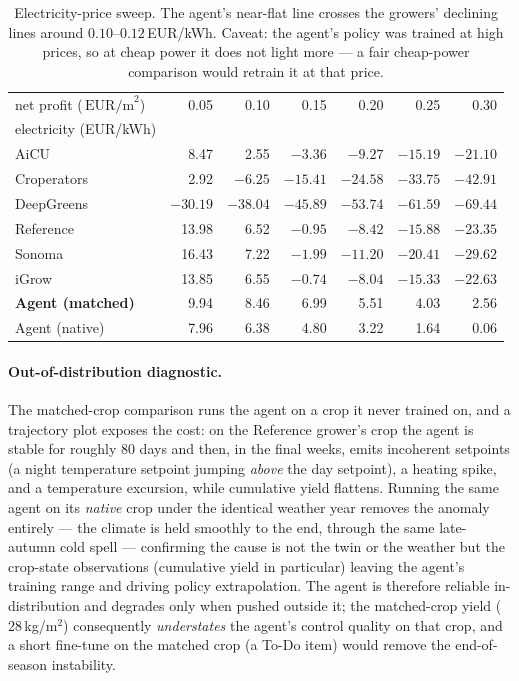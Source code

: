 \documentclass[11pt]{article}
\newcommand{\eurpm}{\,\text{EUR/m}^2}
\begin{document}
\begin{table}[h]
\centering
\small
\begin{tabular}{lrrrrrr}
\toprule
net profit ($\eurpm$) & 0.05 & 0.10 & 0.15 & 0.20 & 0.25 & 0.30 \\
electricity (EUR/kWh) & & & & & & \\
\midrule
AiCU        &  8.47 &  2.55 & $-3.36$ & $-9.27$ & $-15.19$ & $-21.10$ \\
Croperators &  2.92 & $-6.25$ & $-15.41$ & $-24.58$ & $-33.75$ & $-42.91$ \\
DeepGreens  & $-30.19$ & $-38.04$ & $-45.89$ & $-53.74$ & $-61.59$ & $-69.44$ \\
Reference   & 13.98 &  6.52 & $-0.95$ & $-8.42$ & $-15.88$ & $-23.35$ \\
Sonoma      & 16.43 &  7.22 & $-1.99$ & $-11.20$ & $-20.41$ & $-29.62$ \\
iGrow       & 13.85 &  6.55 & $-0.74$ & $-8.04$ & $-15.33$ & $-22.63$ \\
\midrule
\textbf{Agent (matched)} &  9.94 &  8.46 &  6.99 &  5.51 &  4.03 &  2.56 \\
Agent (native)           &  7.96 &  6.38 &  4.80 &  3.22 &  1.64 &  0.06 \\
\bottomrule
\end{tabular}
\caption{Electricity-price sweep. The agent's near-flat line crosses the growers'
declining lines around $0.10$--$0.12$\,EUR/kWh. Caveat: the agent's policy was
trained at high prices, so at cheap power it does not light more --- a fair
cheap-power comparison would retrain it at that price.}
\label{tab:sweep}
\end{table}

\paragraph{Out-of-distribution diagnostic.} The matched-crop comparison runs the
agent on a crop it never trained on, and a trajectory plot exposes the cost: on the
Reference grower's crop the agent is stable for roughly $80$ days and then, in the
final weeks, emits incoherent setpoints (a night temperature setpoint jumping
\emph{above} the day setpoint), a heating spike, and a temperature excursion, while
cumulative yield flattens. Running the same agent on its \emph{native} crop under
the identical weather year removes the anomaly entirely --- the climate is held
smoothly to the end, through the same late-autumn cold spell --- confirming the
cause is not the twin or the weather but the crop-state observations (cumulative
yield in particular) leaving the agent's training range and driving policy
extrapolation. The agent is therefore reliable in-distribution and degrades only
when pushed outside it; the matched-crop yield ($28$\,kg/m$^2$) consequently
\emph{understates} the agent's control quality on that crop, and a short fine-tune
on the matched crop (a To-Do item) would remove the end-of-season instability.
\end{document}
